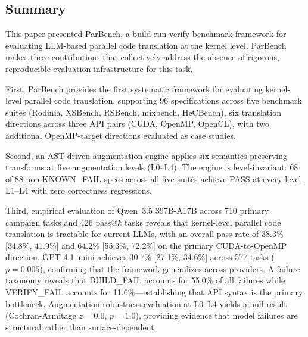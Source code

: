 \documentclass[conference]{IEEEtran}
\begin{document}
\subsection{Summary}

This paper presented ParBench, a build-run-verify benchmark framework for evaluating LLM-based parallel code translation at the kernel level. ParBench makes three contributions that collectively address the absence of rigorous, reproducible evaluation infrastructure for this task.

First, ParBench provides the first systematic framework for evaluating kernel-level parallel code translation, supporting 96 specifications across five benchmark suites (Rodinia, XSBench, RSBench, mixbench, HeCBench), six translation directions across three API pairs (CUDA, OpenMP, OpenCL), with two additional OpenMP-target directions evaluated as case studies.

Second, an AST-driven augmentation engine applies six semantics-preserving transforms at five augmentation levels (L0--L4). The engine is level-invariant: 68 of 88 non-KNOWN\_FAIL specs across all five suites achieve PASS at every level L1--L4 with zero correctness regressions.

Third, empirical evaluation of Qwen~3.5 397B-A17B across 710 primary campaign tasks and 426 pass@$k$ tasks reveals that kernel-level parallel code translation is tractable for current LLMs, with an overall pass rate of 38.3\% [34.8\%, 41.9\%] and 64.2\% [55.3\%, 72.2\%] on the primary CUDA-to-OpenMP direction. GPT-4.1~mini achieves 30.7\% [27.1\%, 34.6\%] across 577 tasks ($p = 0.005$), confirming that the framework generalizes across providers. %
A failure taxonomy reveals that BUILD\_FAIL accounts for 55.0\% of all failures while VERIFY\_FAIL accounts for 11.6\%---establishing that API syntax is the primary bottleneck. Augmentation robustness evaluation at L0--L4 yields a null result (Cochran-Armitage $z = 0.0$, $p = 1.0$), providing evidence that model failures are structural rather than surface-dependent.
\end{document}
